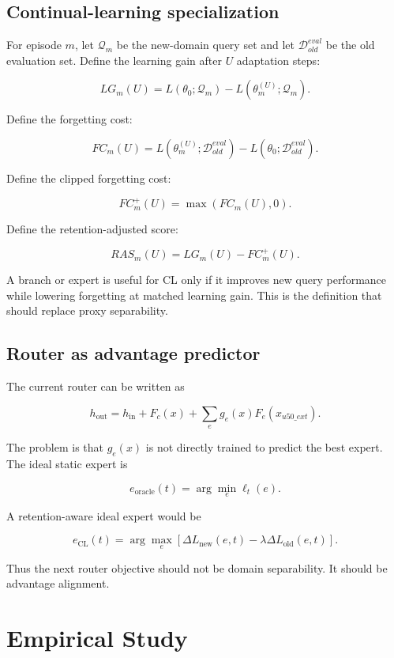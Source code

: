 \documentclass[11pt]{article}
\begin{document}
\subsection{Continual-learning specialization}

For episode $m$, let $\mathcal{Q}_m$ be the new-domain query set and let $\mathcal{D}_{old}^{eval}$ be the old evaluation set. Define the learning gain after $U$ adaptation steps:

$$
LG_m(U)
=
L(\theta_0;\mathcal{Q}_m)
-
L(\theta_m^{(U)};\mathcal{Q}_m).
$$

Define the forgetting cost:

$$
FC_m(U)
=
L(\theta_m^{(U)};\mathcal{D}_{old}^{eval})
-
L(\theta_0;\mathcal{D}_{old}^{eval}).
$$

Define the clipped forgetting cost:

$$
FC_m^+(U)=\max(FC_m(U),0).
$$

Define the retention-adjusted score:

$$
RAS_m(U)=LG_m(U)-FC_m^+(U).
$$

A branch or expert is useful for CL only if it improves new query performance while lowering forgetting at matched learning gain. This is the definition that should replace proxy separability.

\subsection{Router as advantage predictor}

The current router can be written as

$$
h_{\mathrm{out}}
=
h_{\mathrm{in}}
+
F_c(x)
+
\sum_e g_e(x)F_e(x_{u50\_ext}).
$$

The problem is that $g_e(x)$ is not directly trained to predict the best expert. The ideal static expert is

$$
e_{\mathrm{oracle}}(t)
=
\arg\min_e \ell_t(e).
$$

A retention-aware ideal expert would be

$$
e_{\mathrm{CL}}(t)
=
\arg\max_e
\left[
\Delta L_{\mathrm{new}}(e,t)
-
\lambda \Delta L_{\mathrm{old}}(e,t)
\right].
$$

Thus the next router objective should not be domain separability. It should be advantage alignment.

\section{Empirical Study}
\end{document}
